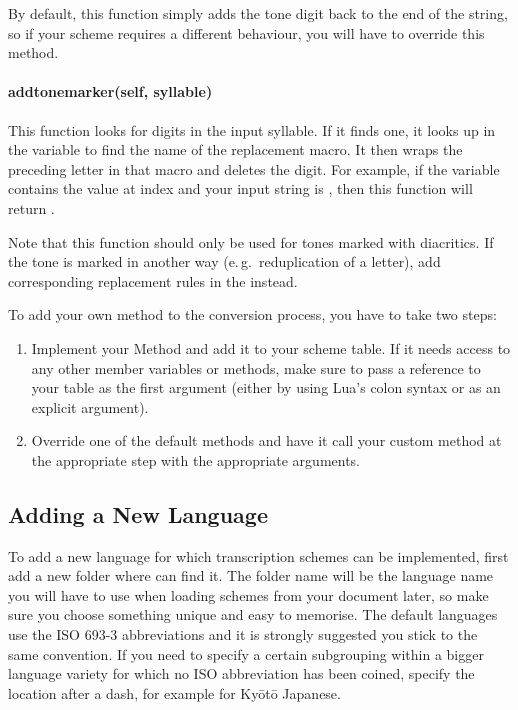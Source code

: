 \documentclass{ltxdockit}
\begin{document}
By default, this function simply adds the tone digit back to the end of the
string, so if your scheme requires a different behaviour, you will have to
override this method.

\paragraph{add\textunderscore{}tone\textunderscore{}marker(self, syllable)}

This function looks for digits in the input syllable. If it finds one, it looks
up in the  variable to find the name of the
replacement macro. It then wraps the preceding letter in that macro and deletes
the digit. For example, if the  variable
contains the value  at index  and your input string is
, then this function will return .

Note that this function should only be used for tones marked with diacritics. If
the tone is marked in another way (e.\,g.\ reduplication of a letter), add
corresponding replacement rules in the
 instead.


To add your own method to the conversion process, you have to take two steps:

\begin{enumerate}
  \item Implement your Method and add it to your scheme table. If it needs
    access to any other member variables or methods, make sure to pass a
    reference to your table as the first argument (either by using Lua's colon
    syntax or as an explicit argument).
  \item Override one of the default methods and have it call your custom method
    at the appropriate step with the appropriate arguments.
\end{enumerate}

\subsection{Adding a New Language}

To add a new language for which transcription schemes can be implemented, first
add a new folder where \transconv{} can find it. The folder name will be the
language name you will have to use when loading schemes from your document
later, so make sure you choose something unique and easy to memorise. The
default languages use the ISO 693-3 abbreviations and it is strongly
suggested you
stick to the same convention. If you need to specify a certain subgrouping
within a bigger language variety for which no ISO abbreviation has been coined,
specify the location after a dash, for example  for
Ky\={o}t\={o} Japanese.
\end{document}
